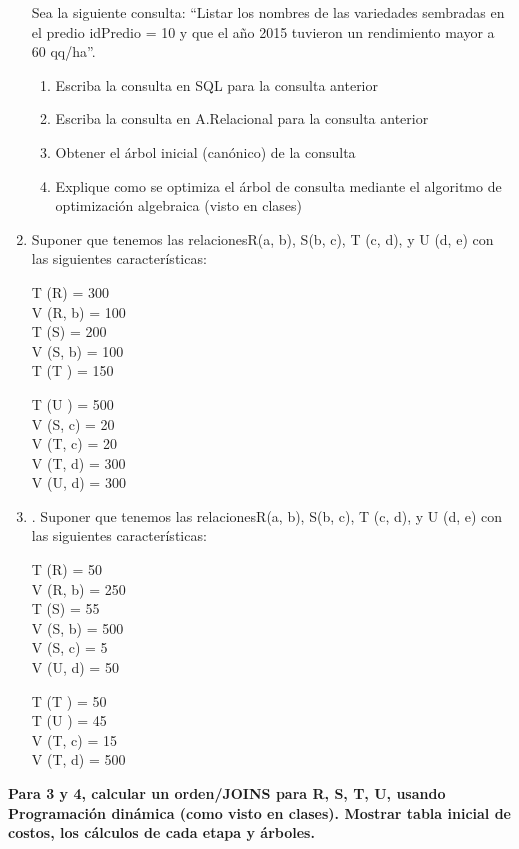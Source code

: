 \documentclass{templateNote}
\begin{document}
\begin{enumerate}
    Sea la siguiente consulta: “Listar los nombres de las variedades sembradas en el predio idPredio = 10 y que el año 2015 tuvieron un rendimiento mayor a 60 qq/ha”.

    \begin{enumerate}[label=\alph*)]
        \item Escriba la consulta en SQL para la consulta anterior
        \item Escriba la consulta en A.Relacional para la consulta anterior
        \item Obtener el árbol inicial (canónico) de la consulta
        \item Explique como se optimiza el árbol de consulta mediante el algoritmo de optimización algebraica (visto en clases)
    \end{enumerate}


    \item Suponer que tenemos las relacionesR(a, b), S(b, c), T (c, d), y U (d, e) con las siguientes características: \\
    
    \begin{minipage}{0.5\textwidth}
        T (R) = 300 \\
        V (R, b) = 100 \\
        T (S) = 200 \\
        V (S, b) = 100 \\
        T (T ) = 150  
        \end{minipage}%
        \begin{minipage}{0.5\textwidth}
        T (U ) = 500 \\
        V (S, c) = 20 \\
        V (T, c) = 20 \\
        V (T, d) = 300 \\
        V (U, d) = 300
    \end{minipage}
        
    
    \item . Suponer que tenemos las relacionesR(a, b), S(b, c), T (c, d), y U (d, e) con las siguientes características:
    
    \begin{minipage}{0.5\textwidth}
        T (R) = 50 \\
        V (R, b) = 250 \\
        T (S) = 55 \\
        V (S, b) = 500 \\
        V (S, c) = 5 \\
        V (U, d) = 50
        \end{minipage}%
        \begin{minipage}{0.5\textwidth}
        T (T ) = 50 \\
        T (U ) = 45 \\
        V (T, c) = 15 \\
        V (T, d) = 500
    \end{minipage}

\end{enumerate}

\begin{tcolorbox}
    \textbf{Para 3 y 4, calcular un orden/JOINS para R, S, T, U, usando Programación dinámica (como visto en clases). Mostrar tabla inicial de costos, los cálculos de cada etapa y árboles.}
\end{tcolorbox}
    
\end{document}
